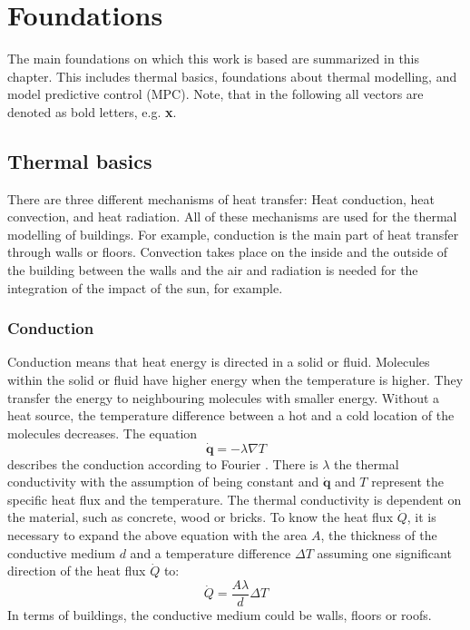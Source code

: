 \chapter{Foundations}
\label{ch:foundations}

The main foundations on which this work is based are summarized in this chapter. This includes thermal basics, foundations about thermal modelling, and model predictive control (MPC). Note, that in the following all vectors are denoted as bold letters, e.g. \textbf{x}.

\section{Thermal basics}
\label{section:thermalbasics}

There are three different mechanisms of heat transfer: Heat conduction, heat convection, and heat radiation\cite{.2013}. All of these mechanisms are used for the thermal modelling of buildings. For example, conduction is the main part of heat transfer through walls or floors. Convection takes place on the inside and the outside of the building between the walls and the air and radiation is needed for the integration of the impact of the sun, for example.

\subsection{Conduction}
\label{subsection:conduction}

    Conduction means that heat energy is directed in a solid or fluid. Molecules within the solid or fluid have higher energy when the temperature is higher. They transfer the energy to neighbouring molecules with smaller energy. Without a heat source, the temperature difference between a hot and a cold location of the molecules decreases.\cite{Kuchling.2007}
    \newline The equation
    \begin{equation}
    \label{eq:fourier}
        \dot{\textbf{q}} = - \lambda \nabla T
    \end{equation}
    describes the conduction according to Fourier \cite{.2013}. There is $\lambda$ the thermal conductivity with the assumption of being constant and $\dot{\textbf{q}}$ and $T$ represent the specific heat flux and the temperature. The thermal conductivity is dependent on the material, such as concrete, wood or bricks. 
    \newline
    To know the heat flux $\dot{Q}$, it is necessary to expand the above equation with the area $A$, the thickness of the conductive medium $d$ and a temperature difference $\Delta T$ assuming one significant direction of the heat flux $\dot{Q}$ to:
    \begin{equation}
    \label{eq:conduction1}
        \dot{Q} = \frac{A\lambda}{d} \Delta T
    \end{equation}
    In terms of buildings, the conductive medium could be walls, floors or roofs.

